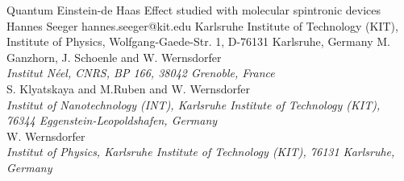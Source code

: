 \begin{conf-abstract}[]
{Quantum Einstein-de Haas Effect studied with molecular spintronic devices}
{\color{blue} Hannes Seeger}
{hannes.seeger@kit.edu}
{Karlsruhe Institute of Technology (KIT), Institute of Physics, Wolfgang-Gaede-Str. 1, D-76131 Karlsruhe, Germany}
{{\color{blue}M. Ganzhorn, J. Schoenle and W. Wernsdorfer}\\ \textit{Institut Néel, CNRS, BP 166, 38042 Grenoble, France}\\ 
{\color{blue}S. Klyatskaya and M.Ruben and W. Wernsdorfer}\\ \textit{ Institut of Nanotechnology (INT), Karlsruhe Institute of Technology (KIT), 76344 Eggenstein-Leopoldshafen, Germany}\\ 
{\color{blue}W. Wernsdorfer}\\ \textit{Institut of Physics, Karlsruhe Institute of Technology (KIT), 76131 Karlsruhe, Germany}\\ 
\decofourleft \decofourright}





\printbibliography[heading=none]

\end{conf-abstract}
